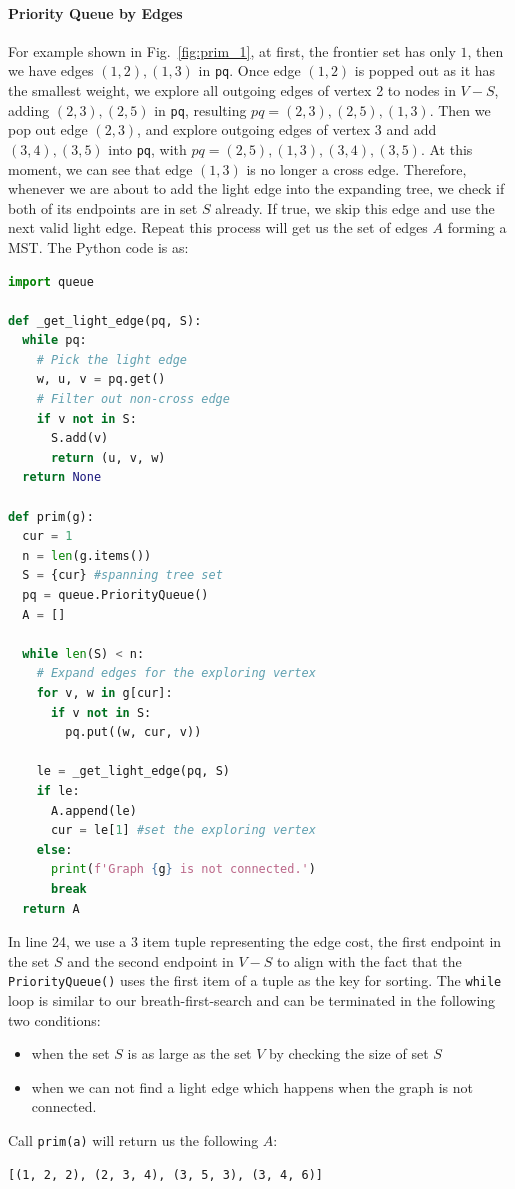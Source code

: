 \documentclass[../main.tex]{subfiles}
\begin{document}
\paragraph{Priority Queue by Edges} For example shown in Fig.~\ref{fig:prim_1}, at first, the frontier set has only $1$, then we have edges $(1,2), (1,3)$ in \texttt{pq}. Once edge $(1,2)$ is popped out as it has the smallest weight, we explore all outgoing edges of vertex 2 to nodes in $V-S$, adding $(2,3), (2,5)$ in \texttt{pq}, resulting $pq=(2,3),(2,5),(1,3)$. Then we pop out edge $(2,3)$, and explore outgoing edges of vertex 3 and add $(3,4),(3,5)$ into \texttt{pq}, with $pq=(2,5),(1,3),(3,4),(3,5)$. At this moment, we can see that edge $(1,3)$ is no longer a cross edge. Therefore, whenever we are about to add the light edge into the expanding tree, we check if both of its endpoints are in set $S$ already. If true, we skip this edge and use the next valid light edge. Repeat this process will get us the set of edges $A$ forming a MST. The Python code is as:
\begin{lstlisting}[language=Python]
import queue

def _get_light_edge(pq, S):
  while pq:
    # Pick the light edge
    w, u, v = pq.get()
    # Filter out non-cross edge
    if v not in S:
      S.add(v)
      return (u, v, w)
  return None
  
def prim(g):
  cur = 1
  n = len(g.items())
  S = {cur} #spanning tree set
  pq = queue.PriorityQueue()
  A = []
  
  while len(S) < n:
    # Expand edges for the exploring vertex
    for v, w in g[cur]:
      if v not in S:
        pq.put((w, cur, v))

    le = _get_light_edge(pq, S)
    if le:
      A.append(le)
      cur = le[1] #set the exploring vertex
    else:
      print(f'Graph {g} is not connected.')
      break
  return A
\end{lstlisting}
In line 24, we use a 3 item tuple representing the edge cost, the first endpoint in the set $S$ and the second endpoint in $V-S$ to align with the fact that the \texttt{PriorityQueue()} uses the first item of a tuple as the key for sorting. The \texttt{while} loop is similar to our breath-first-search and can be terminated in the following two conditions:
\begin{itemize}
    \item when the set $S$ is as large as the set $V$ by checking the size of set $S$
    \item when we can not find a light edge which happens when the graph is not connected.
\end{itemize}
Call \texttt{prim(a)} will return us the following $A$:
\begin{lstlisting}[numbers=none]
[(1, 2, 2), (2, 3, 4), (3, 5, 3), (3, 4, 6)]
\end{lstlisting}
\end{document}
